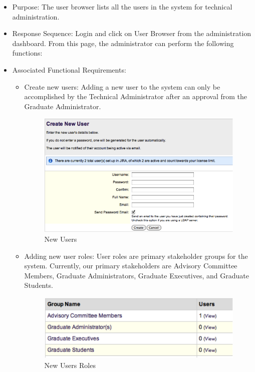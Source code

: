 \documentclass[11pt,a4paper]{report}
\begin{document}
\begin{itemize}
\item Purpose: The user browser lists all the users in the system for technical administration. 
\item Response Sequence: Login and click on User Browser from the administration dashboard. From this page, the administrator can perform the following functions:
\item Associated Functional Requirements:
\begin{itemize}
\item Create new users: Adding a new user to the system can only be accomplished by the Technical Administrator after an approval from the Graduate Administrator. 
\begin{figure}[htp]
\centering
\includegraphics[scale=1]{diagrams/HTMLTemplating/Figure8.png}
\caption{New Users}
\label{fig:NewUser}
\end{figure}
\item Adding new user roles: User roles are primary stakeholder groups for the system. Currently, our primary stakeholders are Advisory Committee Members, Graduate Administrators, Graduate Executives, and Graduate Students.
\begin{figure}[htp]
\centering
\includegraphics[scale=1]{diagrams/HTMLTemplating/Figure9.png}
\caption{New Users Roles}
\label{fig:NewUserRoles}
\end{figure}


\end{itemize}
\end{itemize}
\end{document}
